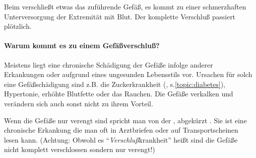 Beim  verschließt etwas das
zuführende Gefäß, es kommt zu einer schmerzhaften 
Unterversorgung der Extremität mit Blut. Der komplette
Verschluß passiert plötzlich. 

\paragraph{Warum kommt es zu einem Gefäßverschluß?}
Meistens liegt eine 
chronische Schädigung der Gefäße infolge anderer Erkankungen oder aufgrund eines ungesunden
Lebensstils vor. Ursachen für solch eine Gefäßschädigung
sind z.B. die Zuckerkrankheit (,
s.\ref{topic:diabetes}), Hypertonie, erhöhte Blutfette oder
das Rauchen. Die Gefäße verkalken und verändern sich auch sonst
nicht zu ihrem Vorteil.

Wenn die Gefäße nur verengt sind spricht man von
der , abgekürzt . Sie ist eine chronische
Erkankung die man oft in Arztbriefen oder auf
Transportscheinen lesen kann. (Achtung: Obwohl es
"`\emph{Verschluß}krankheit"' heißt sind die Gefäße nicht komplett verschlossen sondern nur verengt!)




